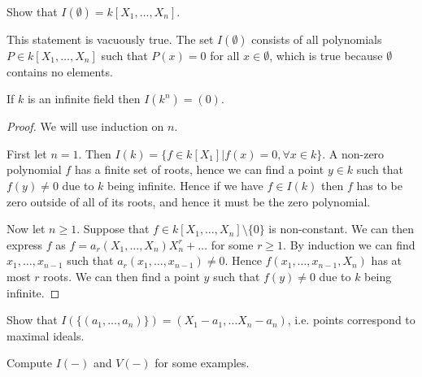 \begin{problem}
Show that $I(\emptyset)=k[X_1, \ldots, X_n]$.
\end{problem}
\begin{solution}
This statement is vacuously true. The set $I(\emptyset)$ consists of all polynomials $P\in k[X_1, \ldots, X_n]$ such that $P(x)=0$ for all $x\in \emptyset$, which is true because $\emptyset$ contains no elements. 
\end{solution}

\begin{proposition}
If $k$ is an infinite field then $I(k^n)=(0)$. 
\end{proposition}
\begin{proof}
We will use induction on $n$.

First let $n=1$. Then $I(k)=\{ f\in k[X_1]\vert f(x)=0, \forall x\in k \}$. A non-zero polynomial $f$ has a finite set of roots, hence we can find a point $y\in k$ such that $f(y)\neq 0$ due to $k$ being infinite. Hence if we have $f\in I(k)$ then $f$ has to be zero outside of all of its roots, and hence it must be the zero polynomial. 

Now let $n\geq 1$. Suppose that $f\in k[X_1, \ldots, X_n]\setminus \{0\}$ is non-constant. We can then express $f$ as $f=a_r(X_1, \ldots, X_n)X_n^r +\ldots$ for some $r\geq 1$. By induction we can find $x_1, \ldots, x_{n-1}$ such that $a_r(x_1, \ldots, x_{n-1})\neq 0$. Hence $f(x_1, \ldots, x_{n-1}, X_n)$ has at most $r$ roots. We can then find a point $y$ such that $f(y)\neq 0$ due to $k$ being infinite. 
\end{proof}

\begin{problem}
Show that $I(\{(a_1, \ldots, a_n)\}) = (X_1 - a_1, \ldots X_n - a_n)$, i.e. points correspond to maximal ideals. 
\end{problem}

\begin{problem}
Compute $I(-)$ and $V(-)$ for some examples.
\end{problem}


